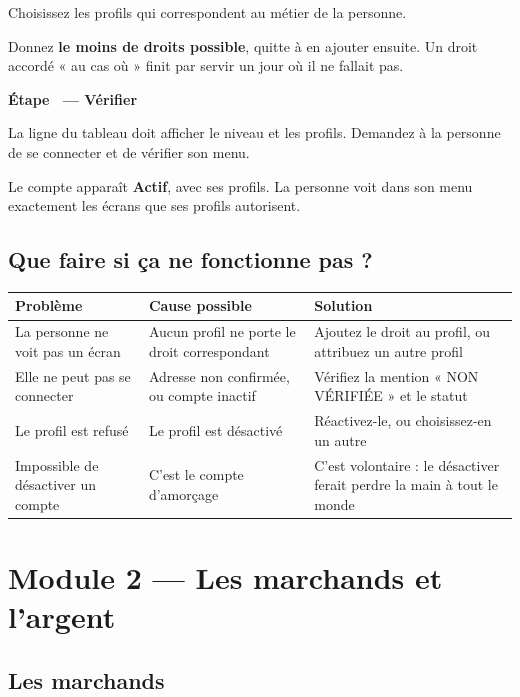 \documentclass[11pt,a4paper]{report}
\newcounter{etape}[section]
\newcommand{\etape}[1]{%
  \stepcounter{etape}%
  \vspace{9pt}%
  \noindent{\color{garahPrimaire}\rule{3pt}{13pt}}\hspace{6pt}%
  {\bfseries\large Étape \theetape\ --- #1}\par\vspace{4pt}%
}
\begin{document}
Choisissez les profils qui correspondent au métier de la personne.

\begin{astuce}
Donnez \textbf{le moins de droits possible}, quitte à en ajouter ensuite. Un
droit accordé « au cas où » finit par servir un jour où il ne fallait pas.
\end{astuce}

\etape{Vérifier}

La ligne du tableau doit afficher le niveau et les profils. Demandez à la
personne de se connecter et de vérifier son menu.

\begin{resultat}
Le compte apparaît \textbf{Actif}, avec ses profils. La personne voit dans son
menu exactement les écrans que ses profils autorisent.
\end{resultat}

\subsection{Que faire si ça ne fonctionne pas ?}

\begin{longtable}{@{}p{4.2cm} p{4cm} p{6cm}@{}}
\toprule
\bfseries Problème & \bfseries Cause possible & \bfseries Solution \\
\midrule
\endhead
La personne ne voit pas un écran
  & Aucun profil ne porte le droit correspondant
  & Ajoutez le droit au profil, ou attribuez un autre profil \\[4pt]
Elle ne peut pas se connecter
  & Adresse non confirmée, ou compte inactif
  & Vérifiez la mention « NON VÉRIFIÉE » et le statut \\[4pt]
Le profil est refusé
  & Le profil est désactivé
  & Réactivez-le, ou choisissez-en un autre \\[4pt]
Impossible de désactiver un compte
  & C'est le compte d'amorçage
  & C'est volontaire : le désactiver ferait perdre la main à tout le monde \\
\bottomrule
\end{longtable}

\section{Module 2 — Les marchands et l'argent}

\subsection{Les marchands}
\end{document}
